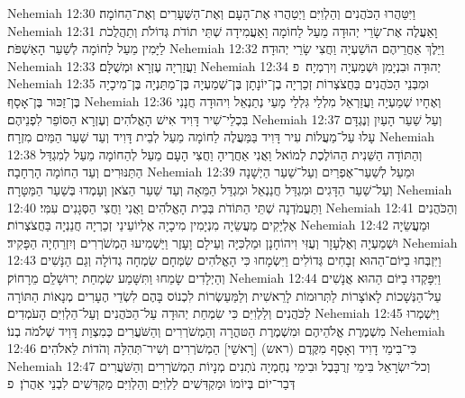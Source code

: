Nehemiah 12:30	וַיִּטַּהֲרוּ הַכֹּהֲנִים וְהַלְוִיִּם וַיְטַהֲרוּ אֶת־הָעָם וְאֶת־הַשְּׁעָרִים וְאֶת־הַחוֹמָה׃
Nehemiah 12:31	וָאַעֲלֶה אֶת־שָׂרֵי יְהוּדָה מֵעַל לַחוֹמָה וָאַעֲמִידָה שְׁתֵּי תוֹדֹת גְּדוֹלֹת וְתַהֲלֻכֹת לַיָּמִין מֵעַל לַחוֹמָה לְשַׁעַר הָאַשְׁפֹּת׃
Nehemiah 12:32	וַיֵּלֶךְ אַחֲרֵיהֶם הוֹשַׁעְיָה וַחֲצִי שָׂרֵי יְהוּדָה׃
Nehemiah 12:33	וַעֲזַרְיָה עֶזְרָא וּמְשֻׁלָּם׃
Nehemiah 12:34	יְהוּדָה וּבִנְיָמִן וּשְׁמַעְיָה וְיִרְמְיָה׃ {פ}
Nehemiah 12:35	וּמִבְּנֵי הַכֹּהֲנִים בַּחֲצֹצְרוֹת זְכַרְיָה בֶן־יוֹנָתָן בֶּן־שְׁמַעְיָה בֶּן־מַתַּנְיָה בֶּן־מִיכָיָה בֶּן־זַכּוּר בֶּן־אָסָף׃
Nehemiah 12:36	וְאֶחָיו שְׁמַעְיָה וַעֲזַרְאֵל מִלְלַי גִּלְלַי מָעַי נְתַנְאֵל וִיהוּדָה חֲנָנִי בִּכְלֵי־שִׁיר דָּוִיד אִישׁ הָאֱלֹהִים וְעֶזְרָא הַסּוֹפֵר לִפְנֵיהֶם׃
Nehemiah 12:37	וְעַל שַׁעַר הָעַיִן וְנֶגְדָּם עָלוּ עַל־מַעֲלוֹת עִיר דָּוִיד בַּמַּעֲלֶה לַחוֹמָה מֵעַל לְבֵית דָּוִיד וְעַד שַׁעַר הַמַּיִם מִזְרָח׃
Nehemiah 12:38	וְהַתּוֹדָה הַשֵּׁנִית הַהוֹלֶכֶת לְמוֹאל וַאֲנִי אַחֲרֶיהָ וַחֲצִי הָעָם מֵעַל לְהַחוֹמָה מֵעַל לְמִגְדַּל הַתַּנּוּרִים וְעַד הַחוֹמָה הָרְחָבָה׃
Nehemiah 12:39	וּמֵעַל לְשַׁעַר־אֶפְרַיִם וְעַל־שַׁעַר הַיְשָׁנָה וְעַל־שַׁעַר הַדָּגִים וּמִגְדַּל חֲנַנְאֵל וּמִגְדַּל הַמֵּאָה וְעַד שַׁעַר הַצֹּאן וְעָמְדוּ בְּשַׁעַר הַמַּטָּרָה׃
Nehemiah 12:40	וַתַּעֲמֹדְנָה שְׁתֵּי הַתּוֹדֹת בְּבֵית הָאֱלֹהִים וַאֲנִי וַחֲצִי הַסְּגָנִים עִמִּי׃
Nehemiah 12:41	וְהַכֹּהֲנִים אֶלְיָקִים מַעֲשֵׂיָה מִנְיָמִין מִיכָיָה אֶלְיוֹעֵינַי זְכַרְיָה חֲנַנְיָה בַּחֲצֹצְרוֹת׃
Nehemiah 12:42	וּמַעֲשֵׂיָה וּשְׁמַעְיָה וְאֶלְעָזָר וְעֻזִּי וִיהוֹחָנָן וּמַלְכִּיָּה וְעֵילָם וָעָזֶר וַיַּשְׁמִיעוּ הַמְשֹׁרְרִים וְיִזְרַחְיָה הַפָּקִיד׃
Nehemiah 12:43	וַיִּזְבְּחוּ בַיּוֹם־הַהוּא זְבָחִים גְּדוֹלִים וַיִּשְׂמָחוּ כִּי הָאֱלֹהִים שִׂמְּחָם שִׂמְחָה גְדוֹלָה וְגַם הַנָּשִׁים וְהַיְלָדִים שָׂמֵחוּ וַתִּשָּׁמַע שִׂמְחַת יְרוּשָׁלַ͏ִם מֵרָחוֹק׃
Nehemiah 12:44	וַיִּפָּקְדוּ בַיּוֹם הַהוּא אֲנָשִׁים עַל־הַנְּשָׁכוֹת לָאוֹצָרוֹת לַתְּרוּמוֹת לָרֵאשִׁית וְלַמַּעַשְׂרוֹת לִכְנוֹס בָּהֶם לִשְׂדֵי הֶעָרִים מְנָאוֹת הַתּוֹרָה לַכֹּהֲנִים וְלַלְוִיִּם כִּי שִׂמְחַת יְהוּדָה עַל־הַכֹּהֲנִים וְעַל־הַלְוִיִּם הָעֹמְדִים׃
Nehemiah 12:45	וַיִּשְׁמְרוּ מִשְׁמֶרֶת אֱלֹהֵיהֶם וּמִשְׁמֶרֶת הַטּהֳרָה וְהַמְשֹׁרְרִים וְהַשֹּׁעֲרִים כְּמִצְוַת דָּוִיד שְׁלֹמֹה בְנוֹ׃
Nehemiah 12:46	כִּי־בִימֵי דָוִיד וְאָסָף מִקֶּדֶם (ראש) [רָאשֵׁי] הַמְשֹׁרְרִים וְשִׁיר־תְּהִלָּה וְהֹדוֹת לֵאלֹהִים׃
Nehemiah 12:47	וְכל־יִשְׂרָאֵל בִּימֵי זְרֻבָּבֶל וּבִימֵי נְחֶמְיָה נֹתְנִים מְנָיוֹת הַמְשֹׁרְרִים וְהַשֹּׁעֲרִים דְּבַר־יוֹם בְּיוֹמוֹ וּמַקְדִּשִׁים לַלְוִיִּם וְהַלְוִיִּם מַקְדִּשִׁים לִבְנֵי אַהֲרֹן׃ {פ}

